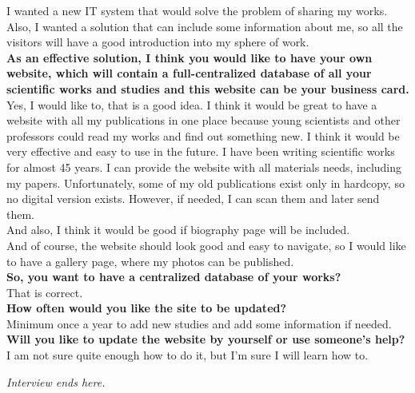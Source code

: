 \documentclass[a4paper]{article}
\begin{document}
I wanted a new IT system that would solve the problem of sharing my works. Also, I wanted a solution that can include some information about me, so all the visitors will have a good introduction into my sphere of work.\\

\textbf{As an effective solution, I think you would like to have your own website, which will contain a full-centralized database of all your scientific works and studies and this website can be your business card.}\\

Yes, I would like to, that is a good idea. I think it would be great to have a website with all my publications in one place because young scientists and other professors could read my works and find out something new. I think it would be very effective and easy to use in the future. I have been writing scientific works for almost 45 years. I can provide the website with all materials needs, including my papers. Unfortunately, some of my old publications exist only in hardcopy, so no digital version exists. However, if needed, I can scan them and later send them. \\

And also, I think it would be good if biography page will be included. \\

And of course, the website should look good and easy to navigate, so I would like to have a gallery page, where my photos can be published.\\

\textbf{So, you want to have a centralized database of your works?}\\

That is correct.\\

\textbf{How often would you like the site to be updated?}\\

Minimum once a year to add new studies and add some information if needed.\\

\textbf{Will you like to update the website by yourself or use someone’s help?}\\

I am not sure quite enough how to do it, but I’m sure I will learn how to.\\

\begin{center}
    \textit{Interview ends here.}
\end{center}
\end{document}
